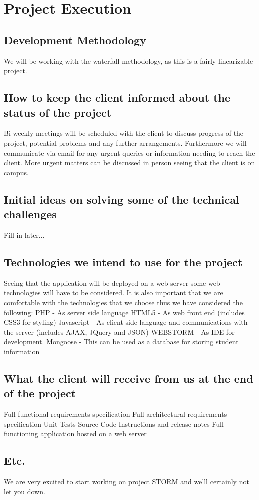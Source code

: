 \documentclass[12pt, oneside]{article}
\begin{document}
\section{Project Execution}
	\subsection{Development Methodology}
		We will be working with the waterfall methodology, as this is a fairly linearizable project.
	\subsection{How to keep the client informed about the status of the project}
		Bi-weekly meetings will be scheduled with the client to discuss progress of the project, potential problems and any further arrangements. Furthermore we will communicate via email for any urgent queries or information needing to reach the client. More urgent matters can be discussed in person seeing that the client is on campus. 
	\subsection{Initial ideas on solving some of the technical challenges}
		Fill in later...
	\subsection{Technologies we intend to use for the project}
		Seeing that the application will be deployed on a web server some web technologies will have to be considered.
		It is also important that we are comfortable with the technologies that we choose thus we have considered the following:\newline
		PHP - As server side language\newline
		HTML5 - As web front end (includes CSS3 for styling)\newline
		Javascript - As client side language and communications with the server (includes AJAX, JQuery and JSON)
		WEBSTORM - As IDE for development.
		Mongoose - This can be used as a database for storing student information
	\subsection{What the client will receive from us at the end of the project}
		Full functional requirements specification\newline
		Full architectural requirements specification\newline
		Unit Tests\newline
		Source Code\newline
		Instructions and release notes\newline
		Full functioning application hosted on a web server\newline	
	\subsection{Etc.}
		We are very excited to start working on project STORM and we'll certainly not let you down.
\end{document}
